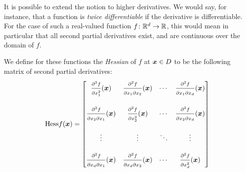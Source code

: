 It is possible to extend the notion to higher derivatives.  We would say, for instance, that a function is \emph{twice differentiable} if the derivative is differentiable.  For the case of such a real-valued function $f \colon \mathbb{R}^d \to \mathbb{R}$, this would mean in particular that all second partial derivatives exist, and are continuous over the domain of $f$.

We define for these functions the \emph{Hessian} of $f$ at $\boldsymbol{x} \in D$ to be the following matrix of second partial derivatives:
\begin{equation*}
\mathop{\mathrm{Hess}{f}}(\boldsymbol{x}) = \begin{bmatrix}
\frac{\strut\partial^2 f}{\strut\partial x_1^2}(\boldsymbol{x}) & \frac{\strut\partial^2 f}{\strut\partial x_1 \partial x_2}(\boldsymbol{x}) &\dotsb &\frac{\strut\partial^2 f}{\strut\partial x_1 \partial x_d}(\boldsymbol{x}) \\
&&&\\
\frac{\strut\partial^2 f}{\strut\partial x_2 \partial x_1}(\boldsymbol{x}) & \frac{\strut\partial^2 f}{\strut\partial x_2^2}(\boldsymbol{x}) &\dotsb &\frac{\strut\partial^2 f}{\strut\partial x_2 \partial x_d}(\boldsymbol{x}) \\
&&& \\
\vdots & \vdots &\ddots &\vdots \\
&&& \\
\frac{\strut\partial^2 f}{\strut\partial x_d \partial x_1}(\boldsymbol{x}) & \frac{\strut\partial^2 f}{\strut\partial x_d \partial x_2}(\boldsymbol{x}) &\dotsb &\frac{\strut\partial^2 f}{\strut\partial x_d^2}(\boldsymbol{x})
\end{bmatrix}
\end{equation*}